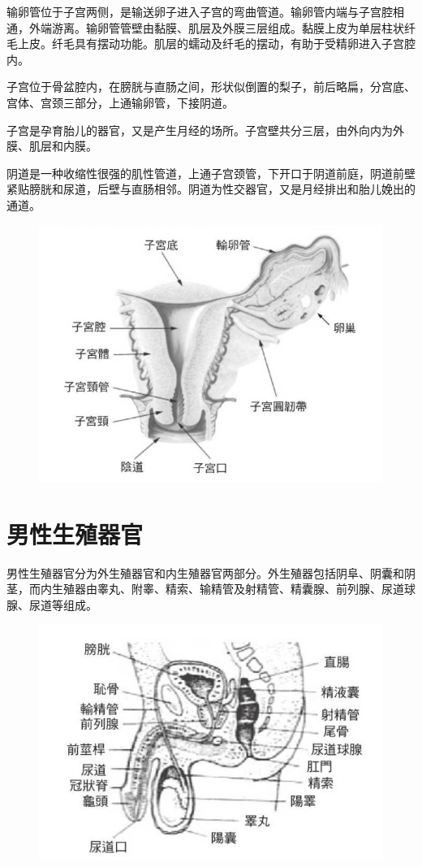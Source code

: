 \documentclass[12pt,UTF8]{ctexbook}
\begin{document}
输卵管位于子宫两侧，是输送卵子进入子宫的弯曲管道。输卵管内端与子宫腔相通，外端游离。输卵管管壁由黏膜、肌层及外膜三层组成。黏膜上皮为单层柱状纤毛上皮。纤毛具有摆动功能。肌层的蠕动及纤毛的摆动，有助于受精卵进入子宫腔内。

子宫位于骨盆腔内，在膀胱与直肠之间，形状似倒置的梨子，前后略扁，分宫底、宫体、宫颈三部分，上通输卵管，下接阴道。

子宫是孕育胎儿的器官，又是产生月经的场所。子宫壁共分三层，由外向内为外膜、肌层和内膜。

阴道是一种收缩性很强的肌性管道，上通子宫颈管，下开口于阴道前庭，阴道前壁紧贴膀胱和尿道，后壁与直肠相邻。阴道为性交器官，又是月经排出和胎儿娩出的通道。

\begin{figure}[htbp]
	\centering
	\includegraphics[width=0.7\linewidth]{3}
	\caption{}
\end{figure}

\chapter{男性生殖器官}

男性生殖器官分为外生殖器官和内生殖器官两部分。外生殖器包括阴阜、阴囊和阴茎，而内生殖器由睾丸、附睾、精索、输精管及射精管、精囊腺、前列腺、尿道球腺、尿道等组成。

\begin{figure}[htbp]
	\centering
	\includegraphics[width=0.7\linewidth]{4}
	\caption{}
\end{figure}
\end{document}
